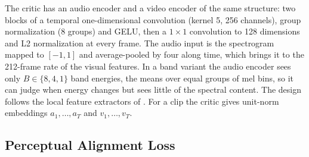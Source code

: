 The critic has an audio encoder and a video encoder of the same structure: two blocks of a temporal one-dimensional convolution (kernel 5, 256 channels), group normalization (8 groups) and GELU, then a $1 \times 1$ convolution to 128 dimensions and L2 normalization at every frame. The audio input is the spectrogram mapped to $[-1,1]$ and average-pooled by four along time, which brings it to the 212-frame rate of the visual features. In a band variant the audio encoder sees only $B \in \{8, 4, 1\}$ band energies, the means over equal groups of mel bins, so it can judge when energy changes but sees little of the spectral content. The design follows the local feature extractors of \citet{niu2023synchronization}. For a clip the critic gives unit-norm embeddings $a_1, \dots, a_T$ and $v_1, \dots, v_T$.

\subsection{Perceptual Alignment Loss}
\label{sec:pal}

